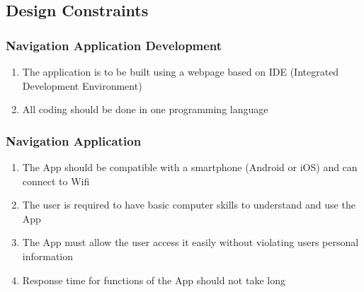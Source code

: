 	\subsection{Design Constraints}
	\subsubsection{Navigation Application Development}
	\begin{enumerate}
	\item The application is to be built using a webpage based on IDE (Integrated Development Environment)
	\item All coding should be done in one programming language  
	\end{enumerate}
	
	\subsubsection{Navigation Application}
	\begin{enumerate}
	\item The App should be compatible with a smartphone (Android or iOS) and can connect to Wifi
	\item The user is required to have basic computer skills to understand and use the App
	\item The App must allow the user access it easily without violating users personal information 
	\item Response time for functions of the App should not take long
	\end{enumerate}
	
	
